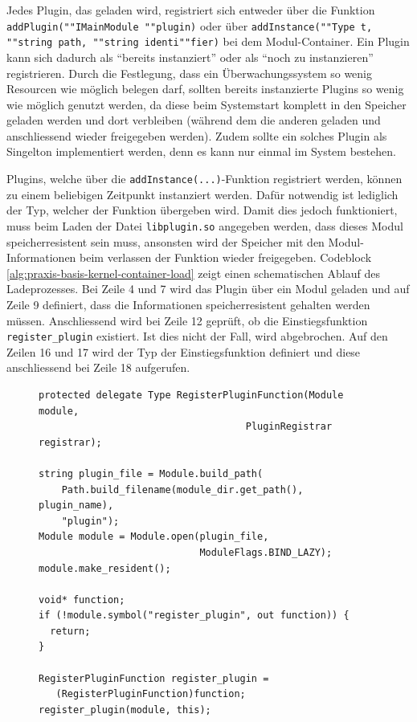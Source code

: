Jedes Plugin, das geladen wird, registriert sich entweder \"uber die Funktion \texttt{addPlugin(""IMainModule ""plugin)} oder \"uber \texttt{addInstance(""Type t, ""string path, ""string identi""fier)} bei dem Modul-Container. Ein Plugin kann sich dadurch als "`bereits instanziert"' oder als "`noch zu instanzieren"' registrieren. Durch die Festlegung, dass ein \"Uberwachungssystem so wenig Resourcen wie m\"oglich belegen darf, sollten bereits instanzierte Plugins so wenig wie m\"oglich genutzt werden, da diese beim Systemstart komplett in den Speicher geladen werden und dort verbleiben (w\"ahrend dem die anderen geladen und anschliessend wieder freigegeben werden). Zudem sollte ein solches Plugin als Singelton implementiert werden, denn es kann nur einmal im System bestehen.

Plugins, welche \"uber die \texttt{addInstance(...)}-Funktion registriert werden, k\"onnen zu einem beliebigen Zeitpunkt instanziert werden. Daf\"ur notwendig ist lediglich der Typ, welcher der Funktion \"ubergeben wird. Damit dies jedoch funktioniert, muss beim Laden der Datei \texttt{libplugin.so} angegeben werden, dass dieses Modul speicherresistent sein muss, ansonsten wird der Speicher mit den Modul-Informationen beim verlassen der Funktion wieder freigegeben. Codeblock \ref{alg:praxis-basis-kernel-container-load} zeigt einen schematischen Ablauf des Ladeprozesses. Bei Zeile 4 und 7 wird das Plugin \"uber ein Modul geladen und auf Zeile 9 definiert, dass die Informationen speicherresistent gehalten werden m\"ussen. Anschliessend wird bei Zeile 12 gepr\"uft, ob die Einstiegsfunktion \texttt{register\_plugin} existiert. Ist dies nicht der Fall, wird abgebrochen. Auf den Zeilen 16 und 17 wird der Typ der Einstiegsfunktion definiert und diese anschliessend bei Zeile 18 aufgerufen.

\begin{figure}[h]
 \lstset{language=[ISO]C++}
 \begin{lstlisting}[label=alg:praxis-basis-kernel-container-load,caption={[Beispiel zum Laden eines bin\"aren Moduls]Ablauf zum Laden eines bin\"aren Modules. Zuerst wird das Modul geladen, speicherresident gehalten, auf die Einstiegsfunktion gepr\"uft und diese, wenn gefunden, aufgerufen.}]
protected delegate Type RegisterPluginFunction(Module module,
                                    PluginRegistrar registrar);

string plugin_file = Module.build_path(
    Path.build_filename(module_dir.get_path(), plugin_name),
    "plugin");
Module module = Module.open(plugin_file,
                            ModuleFlags.BIND_LAZY);
module.make_resident();

void* function;
if (!module.symbol("register_plugin", out function)) {
  return;
}

RegisterPluginFunction register_plugin =
   (RegisterPluginFunction)function;
register_plugin(module, this);
 \end{lstlisting}
\end{figure}

